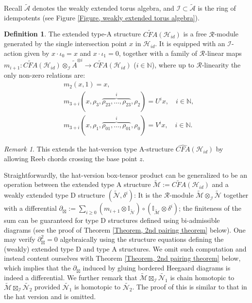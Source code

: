 \documentclass{amsart}
\theoremstyle{definition}
\newtheorem{defn}[thm]{Definition}
\theoremstyle{remark}
\newtheorem{rmk}[thm]{Remark}
\numberwithin{equation}{section}
\numberwithin{equation}{section} \makeatletter
\begin{document}
Recall $\tilde{\mathcal{A}}$ denotes the weakly extended torus algebra, and $\mathcal{I}\subset\tilde{\mathcal{A}}$ is the ring of idempotents (see Figure \ref{Figure, weakly extended torus algebra}). 
\begin{defn}
The extended type-A structure $\widetilde{CFA}(\mathcal{H}_{id})$ is a free $\mathcal{R}$-module generated by the single intersection point $x$ in $\mathcal{H}_{id}$. It is equipped with an $\mathcal{I}$-action given by $x\cdot \iota_0=x$ and $x\cdot \iota_1=0$, together with a family of $\mathcal{R}$-linear maps $m_{i+1}: \widetilde{CFA}(\mathcal{H}_{id})\otimes_{\mathcal{I}} \tilde{A}^{\otimes i}\rightarrow \widetilde{CFA}(\mathcal{H}_{id})$ ($i\in \mathbb{N}$), where up to $\mathcal{R}$-linearity the only non-zero relations are:
$$
\begin{aligned}
&m_2(x,1)=x,\\
&m_{3+i}(x,\rho_3,\overbrace{\rho_{23},\ldots,\rho_{23}}^{i},\rho_2)=U^ix, \quad i\in\mathbb{N},\\
&m_{3+i}(x,\rho_1,\overbrace{\rho_{01},\ldots,\rho_{01}}^{i},\rho_0)=V^ix, \quad i\in\mathbb{N}.
\end{aligned}
$$
\end{defn}
\begin{rmk}
This extends the hat-version type A-structure $\widehat{CFA}(\mathcal{H}_{id})$ by allowing Reeb chords crossing the base point $z$. 
\end{rmk}
Straightforwardly, the hat-version box-tensor product can be generalized to be an operation between the extended type A structure $\widetilde{\mathcal{M}}:=\widetilde{CFA}(\mathcal{H}_{id})$ and a weakly extended type D structure $(\widetilde{\mathcal{N}},\delta^i)$: It is the $\mathcal{R}$-module $\widetilde{\mathcal{M}}\otimes_\mathcal{I}\widetilde{\mathcal{N}}$ together with a differential $\partial_\boxtimes:=\sum_{i\geq 0} (m_{i+1}\otimes \mathbb{I}_{\widetilde{\mathcal{N}}})\circ(\mathbb{I}_{\widetilde{\mathcal{M}}}\otimes \delta^i)$; the finiteness of the sum can be guaranteed for type D structures defined using bi-admissible diagrams (see the proof of Theorem \ref{Theorem, 2nd pairing theorem} below). One may verify $\partial_\boxtimes^2=0$ algebraically using the structure equations defining the (weakly) extended type D and type A structures. We omit such computation and instead content ourselves with Theorem \ref{Theorem, 2nd pairing theorem} below, which implies that the $\partial_{\boxtimes}$ induced by gluing bordered Heegaard diagrams is indeed a differential. We further remark that $\widetilde{\mathcal{M}}\boxtimes_\mathcal{I}\widetilde{\mathcal{N}_1}$ is chain homotopic to $\widetilde{\mathcal{M}}\boxtimes_\mathcal{I}\widetilde{\mathcal{N}_2}$ provided $\widetilde{\mathcal{N}_1}$ is homotopic to $\widetilde{\mathcal{N}_2}$. The proof of this is similar to that in the hat version and is omitted.
\end{document}
